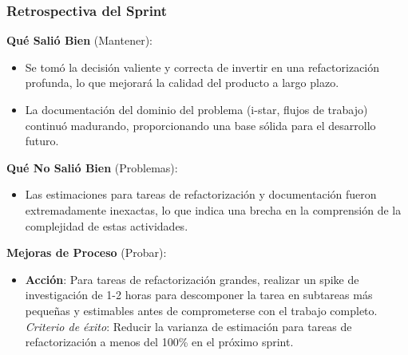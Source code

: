 \subsubsection{Retrospectiva del Sprint}

\textbf{Qué Salió Bien} (Mantener):
\begin{itemize}
    \item Se tomó la decisión valiente y correcta de invertir en una refactorización profunda, lo que mejorará la calidad del producto a largo plazo.
    \item La documentación del dominio del problema (i-star, flujos de trabajo) continuó madurando, proporcionando una base sólida para el desarrollo futuro.
\end{itemize}

\textbf{Qué No Salió Bien} (Problemas):
\begin{itemize}
    \item Las estimaciones para tareas de refactorización y documentación fueron extremadamente inexactas, lo que indica una brecha en la comprensión de la complejidad de estas actividades.
\end{itemize}

\textbf{Mejoras de Proceso} (Probar):
\begin{itemize}
    \item \textbf{Acción}: Para tareas de refactorización grandes, realizar un spike de investigación de 1-2 horas para descomponer la tarea en subtareas más pequeñas y estimables antes de comprometerse con el trabajo completo. \textit{Criterio de éxito}: Reducir la varianza de estimación para tareas de refactorización a menos del 100\% en el próximo sprint.
\end{itemize}
